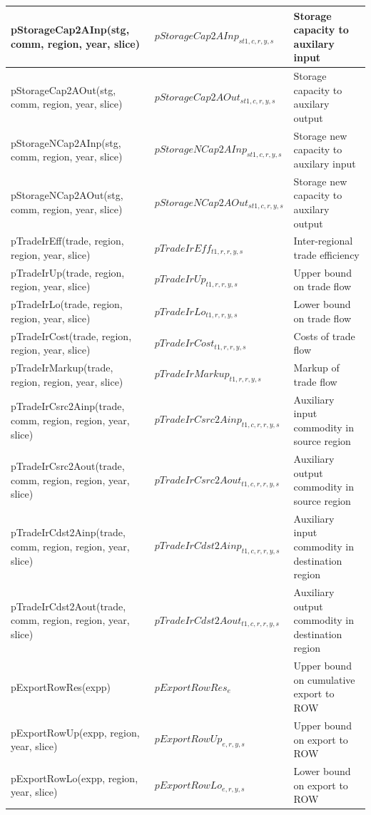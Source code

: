 \documentclass{article}
\begin{document}
\begin{longtable}{|p{10cm}|p{5cm}|p{9cm}|}
 \hline
pStorageCap2AInp(stg, comm, region, year, slice) & $pStorageCap2AInp_{st1,c,r,y,s}$ & Storage capacity to auxilary input \\ 
 \hline
pStorageCap2AOut(stg, comm, region, year, slice) & $pStorageCap2AOut_{st1,c,r,y,s}$ & Storage capacity to auxilary output \\ 
 \hline
pStorageNCap2AInp(stg, comm, region, year, slice) & $pStorageNCap2AInp_{st1,c,r,y,s}$ & Storage new capacity to auxilary input \\ 
 \hline
pStorageNCap2AOut(stg, comm, region, year, slice) & $pStorageNCap2AOut_{st1,c,r,y,s}$ & Storage new capacity to auxilary output \\ 
 \hline
pTradeIrEff(trade, region, region, year, slice) & $pTradeIrEff_{t1,r,r,y,s}$ & Inter-regional trade efficiency \\ 
 \hline
pTradeIrUp(trade, region, region, year, slice) & $pTradeIrUp_{t1,r,r,y,s}$ & Upper bound on trade flow \\ 
 \hline
pTradeIrLo(trade, region, region, year, slice) & $pTradeIrLo_{t1,r,r,y,s}$ & Lower bound on trade flow \\ 
 \hline
pTradeIrCost(trade, region, region, year, slice) & $pTradeIrCost_{t1,r,r,y,s}$ & Costs of trade flow \\ 
 \hline
pTradeIrMarkup(trade, region, region, year, slice) & $pTradeIrMarkup_{t1,r,r,y,s}$ & Markup of trade flow \\ 
 \hline
pTradeIrCsrc2Ainp(trade, comm, region, region, year, slice) & $pTradeIrCsrc2Ainp_{t1,c,r,r,y,s}$ & Auxiliary input commodity in source region \\ 
 \hline
pTradeIrCsrc2Aout(trade, comm, region, region, year, slice) & $pTradeIrCsrc2Aout_{t1,c,r,r,y,s}$ & Auxiliary output commodity in source region \\ 
 \hline
pTradeIrCdst2Ainp(trade, comm, region, region, year, slice) & $pTradeIrCdst2Ainp_{t1,c,r,r,y,s}$ & Auxiliary input commodity in destination region \\ 
 \hline
pTradeIrCdst2Aout(trade, comm, region, region, year, slice) & $pTradeIrCdst2Aout_{t1,c,r,r,y,s}$ & Auxiliary output commodity in destination region \\ 
 \hline
pExportRowRes(expp) & $pExportRowRes_{e}$ & Upper bound on cumulative export to ROW \\ 
 \hline
pExportRowUp(expp, region, year, slice) & $pExportRowUp_{e,r,y,s}$ & Upper bound on export to ROW \\ 
 \hline
pExportRowLo(expp, region, year, slice) & $pExportRowLo_{e,r,y,s}$ & Lower bound on export to ROW \\ 

\end{longtable}
\end{document}
